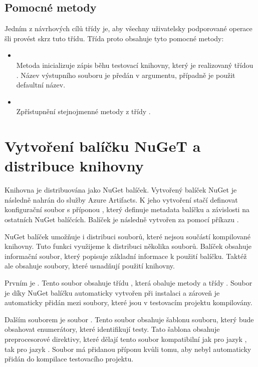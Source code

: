\subsection{Pomocné metody}
Jedním z návrhových cílů třídy  je, aby všechny uživatelsky podporované operace šli provést skrz tuto třídu. Třída proto obsahuje tyto pomocné metody:
\begin{itemize}
    \item {}\\
    Metoda inicializuje zápis běhu testovací knihovny, který je realizovaný třídou . Název výstupního souboru je předán v argumentu, případně je použit defaultní název.
    \item {} \\
    Zpřístupnění stejnojmenné metody z třídy .
\end{itemize}


\section{Vytvoření balíčku NuGeT a distribuce knihovny}\label{sec:distrbution}

Knihovna je distribuována jako NuGet balíček. Vytvořený balíček NuGet je následně nahrán do služby Azure Artifacts. K jeho vytvoření stačí definovat konfigurační soubor s příponou , který definuje metadata balíčku a závislosti na ostatních NuGet balíčcích. Balíček je následně vytvořen za pomocí příkazu . 

NuGet balíček umožňuje i distribuci souborů, které nejsou součástí kompilované knihovny. Tuto funkci využijeme k distribuci několika souborů. Balíček obsahuje informační soubor, který popisuje základní informace k použití balíčku. Taktéž ale obsahuje soubory, které usnadňují použití knihovny. 

Prvním je . Tento soubor obsahuje třídu , která obaluje metody  a  třídy . Soubor je díky NuGet balíčku automaticky vytvořen při instalaci a zároveň je automaticky přidán mezi soubory, které jsou v testovacím projektu kompilovány. 

Dalším souborem je soubor . Tento soubor obsahuje šablonu souboru, který bude obsahovat enumerátory, které identifikují testy. Tato šablona obsahuje preprocesorové direktivy, které dělají tento soubor kompatibilní jak pro jazyk \csharp{}, tak pro jazyk \cpp{}. Soubor má přidanou příponu  kvůli tomu, aby nebyl automaticky přidán do kompilace testovacího projektu.

